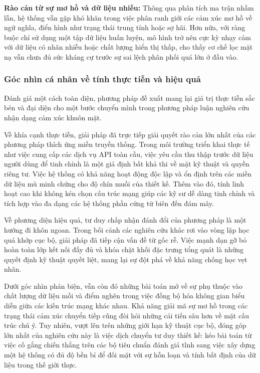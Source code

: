 \textbf{Rào cản từ sự mơ hồ và dữ liệu nhiễu:} 
Thông qua phân tích ma trận nhầm lẫn, hệ thống vẫn gặp khó khăn trong việc phân ranh giới các cảm xúc mơ hồ về ngữ nghĩa, điển hình như trạng thái trung tính hoặc sợ hãi. Hơn nữa, với ràng buộc chỉ sử dụng một tập dữ liệu huấn luyện, mô hình trở nên cực kỳ nhạy cảm với dữ liệu có nhãn nhiễu hoặc chất lượng hiển thị thấp, cho thấy cơ chế lọc mặt nạ vẫn chưa đủ sức kháng cự trước sự sai lệch phân phối quá lớn ở đầu vào.

\subsubsection{Góc nhìn cá nhân về tính thực tiễn và hiệu quả}

Đánh giá một cách toàn diện, phương pháp đề xuất mang lại giá trị thực tiễn sắc bén và đại diện cho một bước chuyển mình trong phương pháp luận nghiên cứu nhận dạng cảm xúc khuôn mặt.

Về khía cạnh thực tiễn, giải pháp đã trực tiếp giải quyết rào cản lớn nhất của các phương pháp thích ứng miền truyền thống. Trong môi trường triển khai thực tế như việc cung cấp các dịch vụ API toàn cầu, việc yêu cầu thu thập trước dữ liệu người dùng để tinh chỉnh là một giả định bất khả thi về mặt kỹ thuật và quyền riêng tư. Việc hệ thống có khả năng hoạt động độc lập và ổn định trên các miền dữ liệu mù minh chứng cho độ chín muồi của thiết kế. Thêm vào đó, tính linh hoạt cao khi không kén chọn cấu trúc mạng giúp các kỹ sư dễ dàng tinh chỉnh và tích hợp vào đa dạng các hệ thống phần cứng từ biên đến đám mây.

Về phương diện hiệu quả, tư duy chấp nhận đánh đổi của phương pháp là một hướng đi khôn ngoan. Trong bối cảnh các nghiên cứu khác rơi vào vòng lặp học quá khớp cục bộ, giải pháp đã tiếp cận vấn đề từ gốc rễ. Việc mạnh dạn gỡ bỏ hoàn toàn lớp kết nối đầy đủ và khóa chặt khối đặc trưng tổng quát là những quyết định kỹ thuật quyết liệt, mang lại sự đột phá về khả năng chống học vẹt nhãn.

Dưới góc nhìn phản biện, vẫn còn đó những bài toán mở về sự phụ thuộc vào chất lượng dữ liệu mồi và điểm nghẽn trong việc đồng bộ hóa không gian biểu diễn giữa các kiến trúc mạng khác nhau. Khả năng giải mã sự mơ hồ trong các trạng thái cảm xúc chuyển tiếp cũng đòi hỏi những cải tiến sâu hơn về mặt cấu trúc chú ý. Tuy nhiên, vượt lên trên những giới hạn kỹ thuật cục bộ, đóng góp lớn nhất của nghiên cứu này là việc dịch chuyển tư duy thiết kế: kéo bài toán từ việc cố gắng chiến thắng trên các bộ tiêu chuẩn đánh giá tĩnh sang việc xây dựng một hệ thống có đủ độ bền bỉ để đối mặt với sự hỗn loạn và tính bất định của dữ liệu trong thế giới thực.

